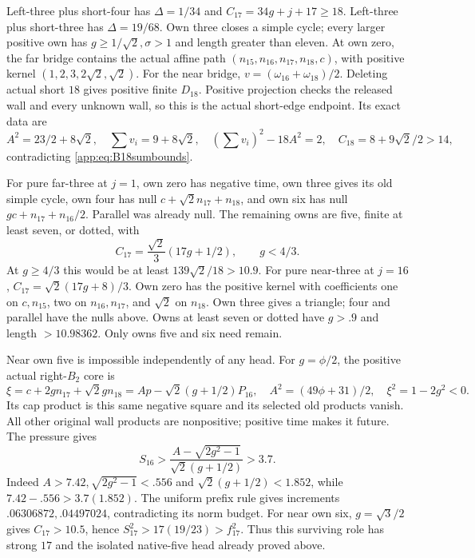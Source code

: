 \documentclass[11pt]{article}
\theoremstyle{definition}
\theoremstyle{remark}
\begin{document}
Left-three plus short-four has
\(\Delta=1/34\) and \(C_{17}=34g+j+17\geq18\).
Left-three plus short-three has \(\Delta=19/68\).
Own three closes a simple cycle; every larger positive own has
\(g\geq1/\sqrt2,\sigma>1\) and length greater than eleven.
At own zero, the far bridge contains the actual affine path
\((n_{15},n_{16},n_{17},n_{18},c)\), with positive kernel
\((1,2,3,2\sqrt2,\sqrt2)\).
For the near bridge, \(v=(\omega_{16}+\omega_{18})/2\).
Deleting actual short \(18\) gives positive finite \(D_{18}\).
Positive projection checks the released wall and every unknown
wall, so this is the actual short-edge endpoint. Its exact data are
\[
 A^2=23/2+8\sqrt2,\quad \sum v_i=9+8\sqrt2,\quad
 (\sum v_i)^2-18A^2=2,\quad
 C_{18}=8+9\sqrt2/2>14,
\]
contradicting \eqref{app:eq:B18sumbounds}.

For pure far-three at \(j=1\), own zero has negative time,
own three gives its old simple cycle, own four has null
\(c+\sqrt2n_{17}+n_{18}\), and own six has null
\(g c+n_{17}+n_{16}/2\). Parallel was already null.
The remaining owns are five, finite at least seven, or dotted, with
\[
 C_{17}=\frac{\sqrt2}{3}(17g+1/2),\qquad g<4/3.
\]
At \(g\geq4/3\) this would be at least
\(139\sqrt2/18>10.9\).
For pure near-three at \(j=16\),
\(C_{17}=\sqrt2(17g+8)/3\).
Own zero has the positive kernel with coefficients one on
\(c,n_{15}\), two on \(n_{16},n_{17}\), and \(\sqrt2\) on \(n_{18}\).
Own three gives a triangle; four and parallel have the nulls above.
Owns at least seven or dotted have \(g>.9\) and length
\(>10.98362\). Only owns five and six need remain.

Near own five is impossible independently of any head.
For \(g=\phi/2\), the positive actual right-\(B_2\) core is
\[
 \xi=c+2gn_{17}+\sqrt2gn_{18}
     =A p-\sqrt2(g+1/2)P_{16},
\quad A^2=(49\phi+31)/2,\quad \xi^2=1-2g^2<0.
\]
Its cap product is this same negative square and its selected
old products vanish. All other original wall products are
nonpositive; positive time makes it future. The pressure gives
\[
 S_{16}>
 \frac{A-\sqrt{2g^2-1}}{\sqrt2(g+1/2)}>3.7.
\]
Indeed \(A>7.42,\sqrt{2g^2-1}<.556\) and
\(\sqrt2(g+1/2)<1.852\), while
\(7.42-.556>3.7(1.852)\).
The uniform prefix rule gives increments
\(.06306872,.04497024\), contradicting its norm budget.
For near own six, \(g=\sqrt3/2\) gives \(C_{17}>10.5\), hence
\(S_{17}^2>17(19/23)>f_{17}^2\).
Thus this surviving role has strong \(17\) and the isolated
native-five head already proved above.
\end{document}
